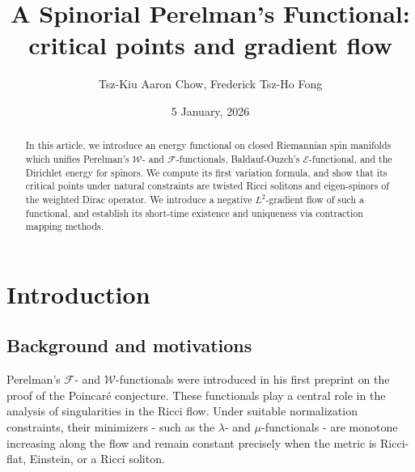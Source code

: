 \documentclass{amsart}
\theoremstyle{definition}
\theoremstyle{remark}
\numberwithin{equation}{section}
\begin{document}
\title[]{A Spinorial Perelman's Functional: critical points and gradient flow}
\author{Tsz-Kiu Aaron Chow, Frederick Tsz-Ho Fong}
\address{Department of Mathematics, Hong Kong University of Science and Technology, Clear Water Bay, Kowloon, Hong Kong SAR.}
\date{5 January, 2026}
\maketitle

\begin{abstract}
In this article, we introduce an energy functional on closed Riemannian spin manifolds which unifies Perelman's $\mathcal{W}$- and $\mathcal{F}$-functionals, Baldauf-Ouzch's $\mathcal{E}$-functional, and the Dirichlet energy for spinors. We compute its first variation formula, and show that its critical points under natural constraints are twisted Ricci solitons and eigen-spinors of the weighted Dirac operator. We introduce a negative $L^2$-gradient flow of such a functional, and establish its short-time existence and uniqueness via contraction mapping methods.
\end{abstract}

\section{Introduction}
\subsection{Background and motivations}
Perelman's $\mathcal{F}$- and $\mathcal{W}$-functionals were introduced in his first preprint \cite{Perelman} on the proof of the Poincar\'e conjecture. These functionals play a central role in the analysis of singularities in the Ricci flow. Under suitable normalization constraints, their minimizers - such as the $\lambda$- and $\mu$-functionals - are monotone increasing along the flow and remain constant precisely when the metric is Ricci-flat, Einstein, or a Ricci soliton.
\end{document}
